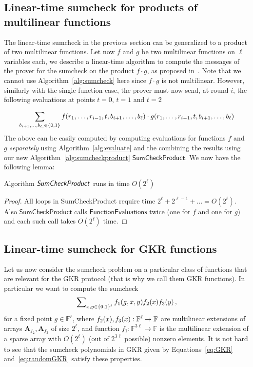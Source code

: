 \subsection{Linear-time sumcheck for products of multilinear functions~\cite{JT_Thesis}\label{particular}}
The linear-time sumcheck in the previous section can be generalized to a product of two multilinear functions. Let now $f$ and $g$ be two multilinear functions on $\ell$ variables each, we describe a linear-time algorithm to compute the messages of the prover for the sumcheck on the product $f\cdot g$, as proposed in~\cite{JT_Thesis}. Note that we cannot use Algorithm~\ref{alg:sumcheck} here since $f\cdot g$ is not multilinear. However, similarly with the single-function case, the prover must now send, at round $i$, the following evaluations at points $t = 0$, $t=1$ and $t=2$

$$\sum_{b_{i+1}, \ldots,b_{\ell, }\in\{0,1\}}f(r_1,\ldots, r_{i-1}, t, b_{i+1},\ldots, b_{\ell})\cdot g(r_1,\ldots, r_{i-1}, t, b_{i+1},\ldots, b_{\ell}) $$
The above can be easily computed by computing evaluations for functions $f$ and $g$ \emph{separately} using Algorithm~\ref{alg:evaluate} and the combining the results using our new Algorithm~\ref{alg:sumcheckproduct} $\textsf{SumCheckProduct}$. We now have the following lemma:
\begin{lemma}\label{main_lemma_complexity}
Algorithm $\textsf{\emph{SumCheckProduct}}$ runs in time $O(2^\ell)$\end{lemma}
\begin{proof}
All loops in \textsf{SumCheckProduct} require time $2^\ell+2^{\ell-1}+\ldots=O(2^\ell)$. Also $\textsf{SumCheckProduct}$ calls $\textsf{FunctionEvaluations}$ twice (one for $f$ and one for $g$) and each such call takes $O(2^\ell)$ time. \end{proof}



\subsection{Linear-time sumcheck for GKR functions}
Let us now consider the sumcheck problem on a particular class of functions that are relevant for the GKR protocol (that is why we call them GKR functions). In particular we want to compute the sumcheck 
\begin{equation}\label{eq:linearsc}
\sum\nolimits_{x,y\in\{0,1\}^\ell}f_1(g,x,y)f_2(x)f_3(y)\, ,
\end{equation}
for a fixed point $g\in\mathbb{F}^\ell$, where $f_2(x),f_3(x): \mathbb{F}^\ell\rightarrow \mathbb{F}$ are multilinear extensions of arrays $\textbf{A}_{f_2},\textbf{A}_{f_3}$ of size $2^\ell$, and function $f_1:\mathbb{F}^{3\ell}\rightarrow\mathbb{F}$ is the multilinear extension of a sparse array with $O(2^\ell)$ (out of $2^{3\ell}$ possible) nonzero elements. 
It is not hard to see that the sumcheck polynomials in GKR given by Equations~\ref{eq:GKR} and~\ref{eq:randomGKR} satisfy these properties.


